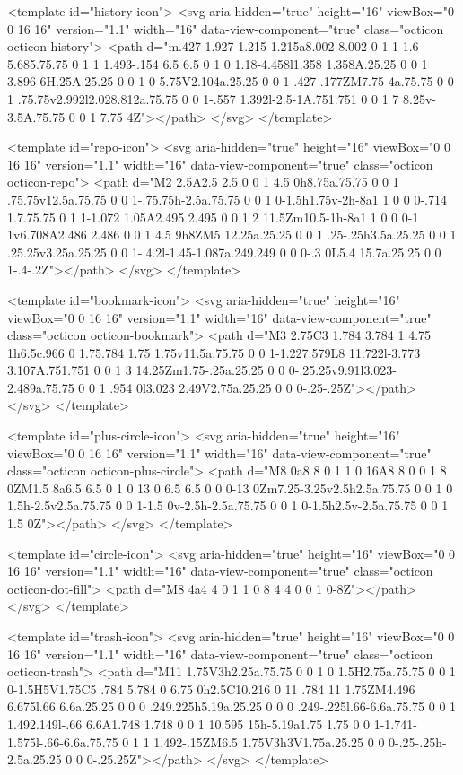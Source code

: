 <template id="history-icon">
  <svg aria-hidden="true" height="16" viewBox="0 0 16 16" version="1.1" width="16" data-view-component="true" class="octicon octicon-history">
    <path d="m.427 1.927 1.215 1.215a8.002 8.002 0 1 1-1.6 5.685.75.75 0 1 1 1.493-.154 6.5 6.5 0 1 0 1.18-4.458l1.358 1.358A.25.25 0 0 1 3.896 6H.25A.25.25 0 0 1 0 5.75V2.104a.25.25 0 0 1 .427-.177ZM7.75 4a.75.75 0 0 1 .75.75v2.992l2.028.812a.75.75 0 0 1-.557 1.392l-2.5-1A.751.751 0 0 1 7 8.25v-3.5A.75.75 0 0 1 7.75 4Z"></path>
</svg>
</template>

<template id="repo-icon">
  <svg aria-hidden="true" height="16" viewBox="0 0 16 16" version="1.1" width="16" data-view-component="true" class="octicon octicon-repo">
    <path d="M2 2.5A2.5 2.5 0 0 1 4.5 0h8.75a.75.75 0 0 1 .75.75v12.5a.75.75 0 0 1-.75.75h-2.5a.75.75 0 0 1 0-1.5h1.75v-2h-8a1 1 0 0 0-.714 1.7.75.75 0 1 1-1.072 1.05A2.495 2.495 0 0 1 2 11.5Zm10.5-1h-8a1 1 0 0 0-1 1v6.708A2.486 2.486 0 0 1 4.5 9h8ZM5 12.25a.25.25 0 0 1 .25-.25h3.5a.25.25 0 0 1 .25.25v3.25a.25.25 0 0 1-.4.2l-1.45-1.087a.249.249 0 0 0-.3 0L5.4 15.7a.25.25 0 0 1-.4-.2Z"></path>
</svg>
</template>

<template id="bookmark-icon">
  <svg aria-hidden="true" height="16" viewBox="0 0 16 16" version="1.1" width="16" data-view-component="true" class="octicon octicon-bookmark">
    <path d="M3 2.75C3 1.784 3.784 1 4.75 1h6.5c.966 0 1.75.784 1.75 1.75v11.5a.75.75 0 0 1-1.227.579L8 11.722l-3.773 3.107A.751.751 0 0 1 3 14.25Zm1.75-.25a.25.25 0 0 0-.25.25v9.91l3.023-2.489a.75.75 0 0 1 .954 0l3.023 2.49V2.75a.25.25 0 0 0-.25-.25Z"></path>
</svg>
</template>

<template id="plus-circle-icon">
  <svg aria-hidden="true" height="16" viewBox="0 0 16 16" version="1.1" width="16" data-view-component="true" class="octicon octicon-plus-circle">
    <path d="M8 0a8 8 0 1 1 0 16A8 8 0 0 1 8 0ZM1.5 8a6.5 6.5 0 1 0 13 0 6.5 6.5 0 0 0-13 0Zm7.25-3.25v2.5h2.5a.75.75 0 0 1 0 1.5h-2.5v2.5a.75.75 0 0 1-1.5 0v-2.5h-2.5a.75.75 0 0 1 0-1.5h2.5v-2.5a.75.75 0 0 1 1.5 0Z"></path>
</svg>
</template>

<template id="circle-icon">
  <svg aria-hidden="true" height="16" viewBox="0 0 16 16" version="1.1" width="16" data-view-component="true" class="octicon octicon-dot-fill">
    <path d="M8 4a4 4 0 1 1 0 8 4 4 0 0 1 0-8Z"></path>
</svg>
</template>

<template id="trash-icon">
  <svg aria-hidden="true" height="16" viewBox="0 0 16 16" version="1.1" width="16" data-view-component="true" class="octicon octicon-trash">
    <path d="M11 1.75V3h2.25a.75.75 0 0 1 0 1.5H2.75a.75.75 0 0 1 0-1.5H5V1.75C5 .784 5.784 0 6.75 0h2.5C10.216 0 11 .784 11 1.75ZM4.496 6.675l.66 6.6a.25.25 0 0 0 .249.225h5.19a.25.25 0 0 0 .249-.225l.66-6.6a.75.75 0 0 1 1.492.149l-.66 6.6A1.748 1.748 0 0 1 10.595 15h-5.19a1.75 1.75 0 0 1-1.741-1.575l-.66-6.6a.75.75 0 1 1 1.492-.15ZM6.5 1.75V3h3V1.75a.25.25 0 0 0-.25-.25h-2.5a.25.25 0 0 0-.25.25Z"></path>
</svg>
</template>

